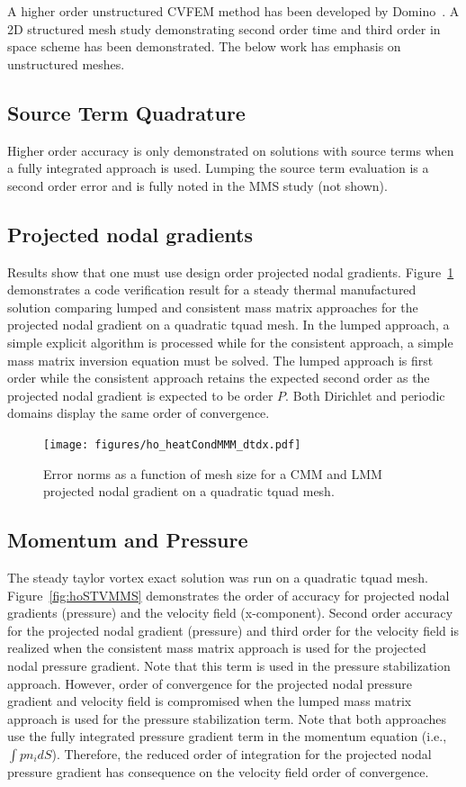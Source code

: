 A higher order unstructured CVFEM method has been developed by Domino~\cite{Domino:2014}. 
A 2D structured mesh study demonstrating second order time and third order in space scheme 
has been demonstrated. The below work has emphasis on unstructured meshes.

\subsection{Source Term Quadrature}
Higher order accuracy is only demonstrated on solutions with source terms when a fully integrated
approach is used. Lumping the source term evaluation is a second order error and is fully noted in
the MMS study (not shown).

\subsection{Projected nodal gradients}
Results show that one must use design order projected nodal gradients. Figure~\ref{fig:pngTempMMS} demonstrates 
a code verification result for a steady thermal manufactured solution comparing lumped and consistent mass matrix approaches for the projected nodal gradient on a quadratic tquad mesh. In the lumped approach, a simple explicit algorithm is processed while for the consistent approach, a simple mass matrix inversion equation must be solved. The lumped approach is first order while the consistent approach retains the expected second order as the projected nodal gradient is expected to be order $P$. Both Dirichlet and periodic domains display the same order of convergence.

\begin{figure}
\centerline{\texttt{[image: figures/ho\_heatCondMMM\_dtdx.pdf]}}
\caption{Error norms as a function of mesh size for a CMM and LMM projected 
nodal gradient on a quadratic tquad mesh.}
\label{fig:pngTempMMS}
\end{figure}

\subsection{Momentum and Pressure}
The steady taylor vortex exact solution was run on a quadratic tquad mesh. Figure~\ref{fig:hoSTVMMS} demonstrates the order of accuracy for projected nodal gradients (pressure) and the velocity field (x-component). Second order accuracy for the projected nodal gradient (pressure) and third order for the velocity field is realized when the consistent mass matrix approach is used for the projected nodal pressure gradient. Note that this term is used in the pressure stabilization approach. However, order of convergence for the projected nodal pressure gradient and velocity field is compromised when the lumped mass matrix approach is used for the pressure stabilization term. Note that both approaches use the fully integrated pressure gradient term in the momentum equation (i.e., $\int p n_i dS$). Therefore, the reduced order of integration for the projected nodal pressure gradient has consequence on the velocity field order of convergence.
 
